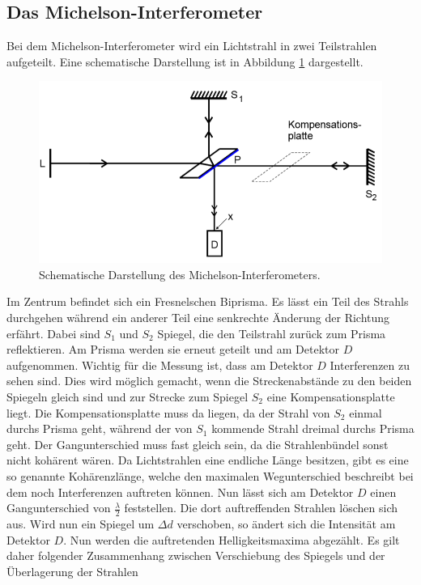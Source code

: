 \subsection{Das Michelson-Interferometer}
Bei dem Michelson-Interferometer wird ein Lichtstrahl in zwei Teilstrahlen aufgeteilt. Eine schematische Darstellung
ist in Abbildung \ref{abb:1} dargestellt.
\begin{figure}[H]
  \centering
  \includegraphics[width=\textwidth]{content/Aufbau.png}
  \caption{Schematische Darstellung des Michelson-Interferometers.\cite{1}}
  \label{abb:1}
\end{figure}
Im Zentrum befindet sich ein Fresnelschen Biprisma. Es lässt ein Teil des Strahls
durchgehen während ein anderer Teil eine senkrechte Änderung der Richtung erfährt. Dabei sind
$S_1$ und $S_2$ Spiegel, die den Teilstrahl zurück zum Prisma reflektieren.
Am Prisma werden sie erneut geteilt und am Detektor $D$ aufgenommen.
Wichtig für die Messung ist, dass am Detektor $D$ Interferenzen zu sehen sind.
Dies wird möglich gemacht,
wenn die Streckenabstände zu den beiden Spiegeln gleich sind und zur Strecke zum Spiegel $S_2$ eine
Kompensationsplatte liegt. Die Kompensationsplatte muss da liegen, da der Strahl von $S_2$ einmal durchs
Prisma geht, während der von $S_1$ kommende Strahl dreimal durchs Prisma geht. Der Gangunterschied
muss fast gleich sein, da die Strahlenbündel sonst nicht kohärent wären.
Da Lichtstrahlen eine endliche Länge besitzen, gibt es eine so genannte Kohärenzlänge, welche den maximalen Wegunterschied
beschreibt bei dem noch Interferenzen auftreten können.
Nun lässt sich am Detektor $D$ einen Gangunterschied von $\frac{\lambda}{2}$ feststellen.
Die dort auftreffenden Strahlen löschen sich aus. Wird nun ein Spiegel um $\Delta d$ verschoben,
so ändert sich die Intensität am Detektor $D$. Nun werden die auftretenden Helligkeitsmaxima abgezählt.
Es gilt daher folgender Zusammenhang zwischen Verschiebung des Spiegels und der Überlagerung der Strahlen
